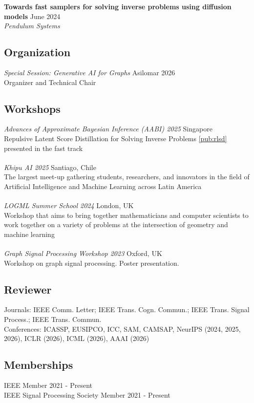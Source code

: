 \documentclass[a4paper,9pt]{extarticle}
\begin{document}
\noindent \textbf{Towards fast samplers for solving inverse problems using diffusion models} \hfill June 2024 \\
\textit{Pendulum Systems}

\subsection*{Organization}
\textit{Special Session: Generative AI for Graphs} \hfill Asilomar 2026\\
Organizer and Technical Chair

\subsection*{Workshops}
\textit{Advances of Approximate Bayesian Inference (AABI) 2025} \hfill Singapore\\
Repulsive Latent Score Distillation for Solving Inverse Problems \ref{pub:rlsd} presented in the fast track\\ \\
\noindent \textit{Khipu AI 2025} \hfill Santiago, Chile\\
The largest meet-up gathering students, researchers, and innovators in the field of Artificial Intelligence and Machine Learning across Latin America\\ \\
\textit{LOGML Summer School 2024} \hfill London, UK\\
Workshop that aims to bring together mathematicians and computer scientists to work together on a variety of problems at the intersection of geometry and machine learning\\ \\
\textit{Graph Signal Processing Workshop 2023} \hfill Oxford, UK\\
Workshop on graph signal processing. Poster presentation.


\subsection*{Reviewer}
\noindent
Journals: IEEE Comm. Letter; IEEE Trans. Cogn. Commun.; IEEE Trans. Signal Process.; IEEE Trans. Commun.\\
Conferences: ICASSP, EUSIPCO, ICC, SAM, CAMSAP, NeurIPS (2024, 2025, 2026), ICLR (2026), ICML (2026), AAAI (2026)
\subsection*{Memberships}
IEEE Member \hfill 2021 - Present\\
IEEE Signal Processing Society Member \hfill 2021 - Present
\end{document}
